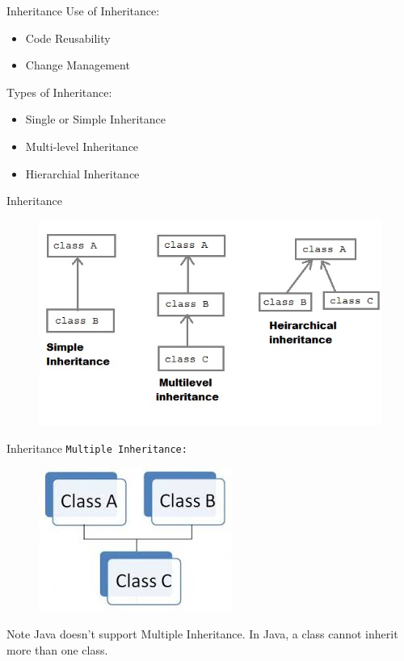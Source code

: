 \documentclass[14pt]{beamer}
\begin{document}
\begin{frame}{Inheritance}
 Use of Inheritance:
 \begin{itemize}
  \item Code Reusability
  \item Change Management
 \end{itemize}
 Types of Inheritance:
 \begin{itemize}
  \item Single or Simple Inheritance
  \item Multi-level Inheritance
  \item Hierarchial Inheritance
 \end{itemize}
\end{frame}


\begin{frame}{Inheritance}
 \begin{figure}[H]
 \begin{center}
   \includegraphics[scale=.5]{inheritance-levels.png}
 \end{center}
 \end{figure}
\end{frame}

\begin{frame}{Inheritance}
 \texttt{Multiple Inheritance:}
 \begin{figure}[H]
 \begin{center}
   \includegraphics[scale=.35]{multiple-inheritance.png}
 \end{center}
 \end{figure}
 \begin{block}{Note}
  Java doesn't support Multiple Inheritance. In Java, a class cannot inherit more than one class.
 \end{block}
\end{frame}
\end{document}
